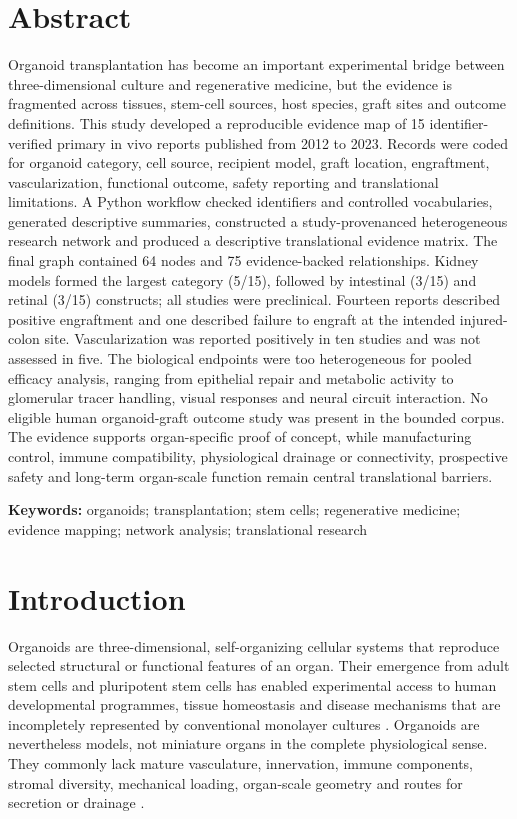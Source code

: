 \documentclass[11pt,a4paper]{article}
\begin{document}
\section*{Abstract}
Organoid transplantation has become an important experimental bridge between three-dimensional culture and regenerative medicine, but the evidence is fragmented across tissues, stem-cell sources, host species, graft sites and outcome definitions. This study developed a reproducible evidence map of 15 identifier-verified primary in vivo reports published from 2012 to 2023. Records were coded for organoid category, cell source, recipient model, graft location, engraftment, vascularization, functional outcome, safety reporting and translational limitations. A Python workflow checked identifiers and controlled vocabularies, generated descriptive summaries, constructed a study-provenanced heterogeneous research network and produced a descriptive translational evidence matrix. The final graph contained 64 nodes and 75 evidence-backed relationships. Kidney models formed the largest category (5/15), followed by intestinal (3/15) and retinal (3/15) constructs; all studies were preclinical. Fourteen reports described positive engraftment and one described failure to engraft at the intended injured-colon site. Vascularization was reported positively in ten studies and was not assessed in five. The biological endpoints were too heterogeneous for pooled efficacy analysis, ranging from epithelial repair and metabolic activity to glomerular tracer handling, visual responses and neural circuit interaction. No eligible human organoid-graft outcome study was present in the bounded corpus. The evidence supports organ-specific proof of concept, while manufacturing control, immune compatibility, physiological drainage or connectivity, prospective safety and long-term organ-scale function remain central translational barriers.

\noindent\textbf{Keywords:} organoids; transplantation; stem cells; regenerative medicine; evidence mapping; network analysis; translational research

\tableofcontents
\listoffigures
\listoftables
\clearpage
{}

\section{Introduction}

Organoids are three-dimensional, self-organizing cellular systems that reproduce selected structural or functional features of an organ. Their emergence from adult stem cells and pluripotent stem cells has enabled experimental access to human developmental programmes, tissue homeostasis and disease mechanisms that are incompletely represented by conventional monolayer cultures \citep{sato2009,spence2011,lancaster2013,clevers2016,rossi2018,kim2020}. Organoids are nevertheless models, not miniature organs in the complete physiological sense. They commonly lack mature vasculature, innervation, immune components, stromal diversity, mechanical loading, organ-scale geometry and routes for secretion or drainage \citep{jensen2023,hofer2021}.
\end{document}
